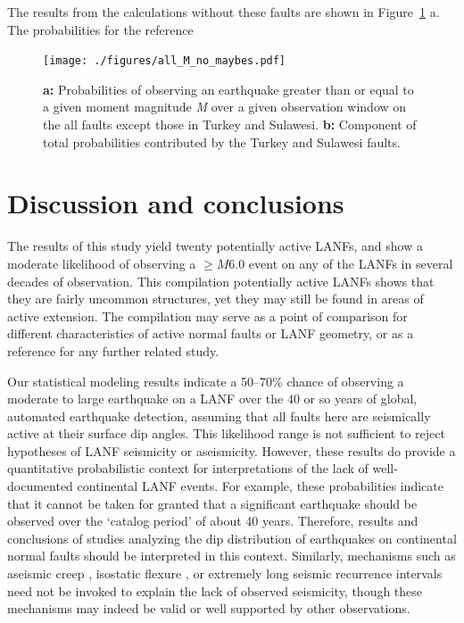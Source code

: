 \documentclass[twocolumn,grl]{AGUTeX}
\begin{document}
\begin{article}
The results from the calculations without these faults are shown in Figure~\ref{fig:all_probs_no_maybes} a. The probabilities for the reference  


\begin{figure}%
\noindent\texttt{[image: ./figures/all\_M\_no\_maybes.pdf]}
\caption{\textbf{a:} Probabilities of observing an earthquake greater than or equal to a given moment magnitude \emph{M} over a given observation window on the all faults except those in Turkey and Sulawesi. \textbf{b:} Component of total probabilities contributed by the Turkey and Sulawesi faults.}
\label{fig:all_probs_no_maybes}
\end{figure}


\section{Discussion and conclusions}

The results of this study yield twenty potentially active LANFs, and show a moderate likelihood of observing a $\ge M$6.0 event on any of the LANFs in several decades of observation.
This compilation potentially active LANFs shows that they are fairly uncommon structures, yet they may still be found in areas of active extension. The compilation may serve as a point of comparison for different characteristics of active normal faults or LANF geometry, or as a reference for any further related study.

Our statistical modeling results indicate a 50--70\% chance of observing a moderate to large earthquake on a LANF over the 40 or so years of global, automated earthquake detection, assuming that all faults here are seismically active at their surface dip angles.  This likelihood range is not sufficient to reject hypotheses of LANF seismicity or aseismicity. However, these results do provide a quantitative probabilistic context for interpretations of the lack of well-documented continental LANF events.  
For example, these probabilities indicate that it cannot be taken for granted that a significant earthquake should be observed over the `catalog period' of about 40 years. Therefore, results and conclusions of studies analyzing the dip distribution of earthquakes on continental normal faults \citep{jackson1987, collettinisibson2001} should be interpreted in this context.  Similarly, mechanisms such as aseismic creep \citep [e.g.,][]{collettini2011lanfmech, hreinsdottir2009altotib}, isostatic flexure \citep[e.g.,][] {wernickeaxen1988rolling}, or extremely long seismic recurrence intervals \citep{wernicke1995seis} need not be invoked to explain the lack of observed seismicity, though these mechanisms may indeed be valid or well supported by other observations.


\end{article}
\end{document}
